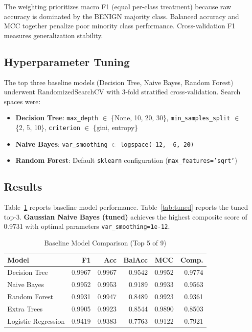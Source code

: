 \documentclass[conference]{IEEEtran}
\begin{document}
The weighting prioritizes macro F1 (equal per-class treatment) because raw accuracy is dominated by the BENIGN majority class. Balanced accuracy and MCC together penalize poor minority class performance. Cross-validation F1 measures generalization stability.

\subsection{Hyperparameter Tuning}

The top three baseline models (Decision Tree, Naive Bayes, Random Forest) underwent RandomizedSearchCV with 3-fold stratified cross-validation. Search spaces were:

\begin{itemize}
    \item \textbf{Decision Tree}: \texttt{max\_depth} $\in$ \{None, 10, 20, 30\}, \texttt{min\_samples\_split} $\in$ \{2, 5, 10\}, \texttt{criterion} $\in$ \{gini, entropy\}
    \item \textbf{Naive Bayes}: \texttt{var\_smoothing} $\in$ \texttt{logspace(-12, -6, 20)}
    \item \textbf{Random Forest}: Default \texttt{sklearn} configuration (\texttt{max\_features='sqrt'})
\end{itemize}

\subsection{Results}

Table~\ref{tab:baseline} reports baseline model performance. Table~\ref{tab:tuned} reports the tuned top-3. \textbf{Gaussian Naive Bayes (tuned)} achieves the highest composite score of 0.9731 with optimal parameters \texttt{var\_smoothing=1e-12}.

\begin{table}[h]
\caption{Baseline Model Comparison (Top 5 of 9)}
\label{tab:baseline}
\centering
\begin{tabular}{@{}lrrrrr@{}}
\toprule
\textbf{Model} & \textbf{F1} & \textbf{Acc} & \textbf{BalAcc} & \textbf{MCC} & \textbf{Comp.} \\
\midrule
Decision Tree        & 0.9967 & 0.9967 & 0.9542 & 0.9952 & 0.9774 \\
Naive Bayes          & 0.9952 & 0.9953 & 0.9189 & 0.9933 & 0.9563 \\
Random Forest        & 0.9931 & 0.9947 & 0.8489 & 0.9923 & 0.9361 \\
Extra Trees          & 0.9905 & 0.9923 & 0.8544 & 0.9890 & 0.8503 \\
Logistic Regression  & 0.9419 & 0.9383 & 0.7763 & 0.9122 & 0.7921 \\
\bottomrule
\end{tabular}
\end{table}
\end{document}
